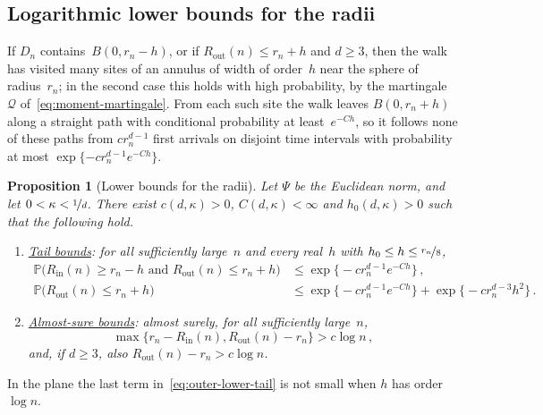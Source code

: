 \documentclass[11pt]{amsart}
\theoremstyle{plain}
\newtheorem{proposition}[theorem]{Proposition}
\theoremstyle{definition}
\renewcommand{\P}{\mathbb P}
\newcommand{\drift}{\kappa}
\newcommand{\gauge}{\Psi}
\newcommand{\nf}{\nicefrac}
\newcommand{\Rin}{R_{\mathrm{in}}}
\newcommand{\Rout}{R_{\mathrm{out}}}
\numberwithin{equation}{section}
\begin{document}
\subsection{Logarithmic lower bounds for the radii}

If $D_n$ contains~$B(0,r_n-h)$, or if $\Rout(n)\leq r_n+h$ and $d\geq3$, then the walk has visited many sites of an annulus of width of order~$h$ near the sphere of radius~$r_n$; in the second case this holds with high probability, by the martingale~$\mathcal Q$ of~\eqref{eq:moment-martingale}. From each such site the walk leaves $B(0,r_n+h)$ along a straight path with conditional probability at least~$e^{-Ch}$, so it follows none of these paths from $cr_n^{d-1}$ first arrivals on disjoint time intervals with probability at most $\exp\{-cr_n^{d-1}e^{-Ch}\}$.

\begin{proposition}[Lower bounds for the radii]\label{prop:log-lower}
Let $\gauge$ be the Euclidean norm, and let $0<\drift<\nf1d$. There exist $c(d,\drift)>0$, $C(d,\drift)<\infty$ and $h_0(d,\drift)>0$ such that the following hold.
\begin{enumerate}[label=\textup{(\roman*)}]
\item \underline{\emph{Tail bounds}}: for all sufficiently large~$n$ and every real~$h$ with $h_0\leq h\leq\nf{r_n}{8}$,
\begin{align}
\P\bigl(\Rin(n)\geq r_n-h\text{ and }\Rout(n)\leq r_n+h\bigr)&\leq\exp\bigl\{-cr_n^{d-1}e^{-Ch}\bigr\}\, ,\label{eq:log-lower-tail}\\
\P\bigl(\Rout(n)\leq r_n+h\bigr)&\leq\exp\bigl\{-cr_n^{d-1}e^{-Ch}\bigr\}+\exp\bigl\{-cr_n^{d-3}h^2\bigr\}\, .\label{eq:outer-lower-tail}
\end{align}
\item \underline{\emph{Almost-sure bounds}}: almost surely, for all sufficiently large~$n$,
\begin{equation}\label{eq:log-lower-as}
\max\{r_n-\Rin(n),\Rout(n)-r_n\}>c\log n\, ,
\end{equation}
and, if $d\geq3$, also $\Rout(n)-r_n>c\log n$.
\end{enumerate}
\end{proposition}

In the plane the last term in~\eqref{eq:outer-lower-tail} is not small when $h$ has order~$\log n$.
\end{document}
